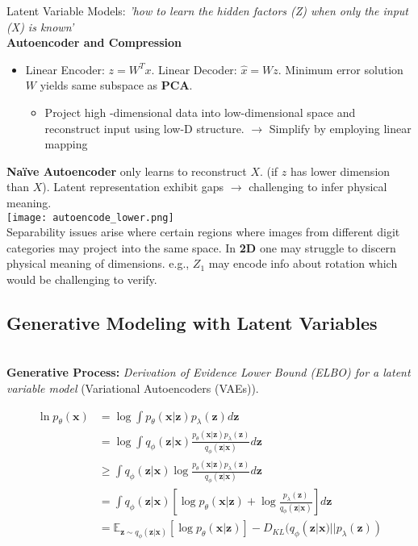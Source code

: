 \documentclass[twocolumn]{article}
\begin{document}
\begin{literaturepaper}{Latent Variable Models:}
    \textit{'how to learn the hidden factors (Z) when only the input (X) is known'}\\

    \textbf{Autoencoder and Compression}

    \begin{itemize}
        \item Linear Encoder: $z = W^Tx$. Linear Decoder: $\hat{x} = Wz$. Minimum error solution $W$ yields same subspace as \textbf{PCA}.
        \begin{itemize}
            \item Project high -dimensional data into low-dimensional space and reconstruct input using low-D structure. $\rightarrow$ Simplify by employing linear mapping
        \end{itemize}
    \end{itemize}

\textbf{Naïve Autoencoder} only learns to reconstruct $X$. (if $z$ has lower dimension than $X$). Latent representation exhibit gaps $\rightarrow$ challenging to infer physical meaning. \\

\texttt{[image: autoencode\_lower.png]}\\

Separability issues arise where certain regions where images from different digit categories may project into the same space. In \textbf{2D} one may struggle to discern physical meaning of dimensions. e.g., $Z_1$ may encode info about rotation which would be challenging to verify.

\subsection*{Generative Modeling with Latent Variables}\\

\textbf{Generative Process:} \textit{Derivation of Evidence Lower Bound (ELBO) for a latent variable model} (Variational Autoencoders (VAEs)).

\begin{align*}
\ln p_{\theta}(\mathbf{x}) &= \log \int p_{\theta}(\mathbf{x}|\mathbf{z})p_{\lambda}(\mathbf{z})d\mathbf{z} \\
&= \log \int q_{\phi}(\mathbf{z}|\mathbf{x}) \frac{p_{\theta}(\mathbf{x}|\mathbf{z})p_{\lambda}(\mathbf{z})}{q_{\phi}(\mathbf{z}|\mathbf{x})} d\mathbf{z} \\
&\ge \int q_{\phi}(\mathbf{z}|\mathbf{x}) \log \frac{p_{\theta}(\mathbf{x}|\mathbf{z})p_{\lambda}(\mathbf{z})}{q_{\phi}(\mathbf{z}|\mathbf{x})} d\mathbf{z} \quad \\
&= \int q_{\phi}(\mathbf{z}|\mathbf{x}) \left[ \log p_{\theta}(\mathbf{x}|\mathbf{z}) + \log \frac{p_{\lambda}(\mathbf{z})}{q_{\phi}(\mathbf{z}|\mathbf{x})} \right] d\mathbf{z} \\
&= \mathbb{E}_{\mathbf{z} \sim q_{\phi}(\mathbf{z}|\mathbf{x})} [\log p_{\theta}(\mathbf{x}|\mathbf{z})] - D_{KL}(q_{\phi}(\mathbf{z}|\mathbf{x}) || p_{\lambda}(\mathbf{z}))
\end{align*}


\end{literaturepaper}
\end{document}
